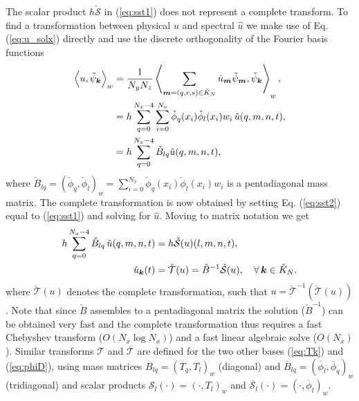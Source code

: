 \documentclass[11pt, oneside]{article}
\newcommand{\N}[1]{\check{#1}}
\newcommand{\D}[1]{\overline{#1}}
\begin{document}
The scalar product  $h\N{\mathcal{S}}$ in (\ref{eq:sst1}) does not represent a 
complete transform. To find a transformation between physical $u$ and spectral 
$\hat{u}$ we make use of Eq. (\ref{eq:u_solx}) directly and use the discrete 
orthogonality of the Fourier basis functions
\begin{align}
\left<u, \N{\psi}_{\bm{k}}\right>_w &= \frac{1}{N_yN_z}\left< 
\sum_{\bm{m}=(q,r,s) \in \N{K}_N} \hat{u}_{\bm{m}} \N{\psi}_{\bm{m}}, 
\N{\psi}_{\bm{k}} \right>_w, \notag \\
           &= h \sum_{q=0}^{N_x-4} \sum_{i=0}^{N_x} \N{\phi}_{q}(x_i) 
           \N{\phi}_{l}(x_i) w_i \, \hat{u}(q, {m}, {n}, t), \notag \\
           &= h \sum_{q=0}^{N_x-4} \N{B}_{lq} \hat{u}(q, {m}, {n}, t), 
           \label{eq:sst2}
\end{align}
where $\N{B}_{lq} = (\N{\phi}_q, \N{\phi}_l)_w = 
\sum_{i=0}^{N_x} \N{\phi}_{q}(x_i) \N{\phi}_{l}(x_i) w_i$ is a 
pentadiagonal mass matrix. The complete transformation is now obtained by 
setting Eq. (\ref{eq:sst2}) equal to (\ref{eq:sst1}) and solving for $\hat{u}$. 
Moving to matrix notation we get
\begin{align}
h\sum_{q=0}^{N_x-4} \N{B}_{lq}\, \hat{u}(q, {m}, {n}, t) &= 
h\N{\mathcal{S}}(u)(l, m, n, t), \notag \\
 \hat{u}_{\bm{k}}(t) &= \N{\mathcal{T}}(u) =  \N{B}^{-1}\N{\mathcal{S}}(u), 
 \quad \forall \, \bm{k} \in \N{K}_N. \label{eq:fstB}
\end{align}
where $\N{\mathcal{T}}(u)$ denotes the complete transformation, such that $u = 
\N{\mathcal{T}}^{-1}(\N{\mathcal{T}}(u))$. Note that since $\N{B}$ assembles to 
a pentadiagonal matrix the solution ($\N{B}^{-1}$) can be obtained very fast 
and 
the complete 
transformation thus requires a fast Chebyshev transform ($O(N_x \log N_x)$) and 
a fast linear algebraic solve ($O(N_x)$). Similar transforms $\mathcal{T}$ 
and $\D{\mathcal{T}}$ are defined for the two other bases (\ref{eq:Tk}) and 
(\ref{eq:phiD}), using mass matrices $B_{lq}=(T_q, T_l)_w$ (diagonal) and 
$\D{B}_{lq}=(\D{\phi}_l, \D{\phi}_q)_w$ (tridiagonal) and scalar products 
$\mathcal{S}_l(\cdot) = (\cdot, T_l)_w$ and $\D{\mathcal{S}}_l(\cdot) = (\cdot, 
\D{\phi}_l)_w$.
\end{document}

